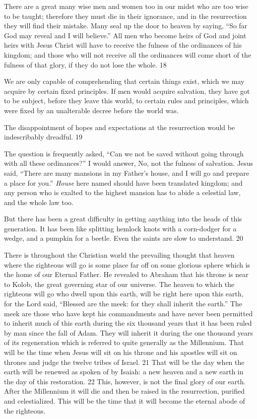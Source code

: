 There are a great many wise men and women too in our midst who are too wise to be taught;
therefore they must die in their ignorance, and in the resurrection they will find their mistake.
Many seal up the door to heaven by saying, ``So far God may reveal and I will believe.''
All men who become heirs of God and joint heirs with Jesus Christ will have to receive the
fulness of the ordinances of his kingdom; and those who will not receive all the ordinances
will come short of the fulness of that glory, if they do not lose the whole. 18

We are only capable of comprehending that certain things exist, which we may acquire by
certain fixed principles. If men would acquire salvation, they have got to be subject, before
they leave this world, to certain rules and principles, which were fixed by an unalterable
decree before the world was.

The disappointment of hopes and expectations at the resurrection would be indescribably
dreadful. 19

The question is frequently asked, ``Can we not be saved without going through with all these
ordinances?'' I would answer, No, not the fulness of salvation. Jesus said, ``There are many
mansions in my Father's house, and I will go and prepare a place for you.'' \textit{House} here named
should have been translated kingdom; and any person who is exalted to the highest mansion
has to abide a celestial law, and the whole law too.

But there has been a great difficulty in getting anything into the heads of this generation. It
has been like splitting hemlock knots with a corn-dodger for a wedge, and a pumpkin for a
beetle. Even the saints are slow to understand. 20

There is throughout the Christian world the prevailing thought that heaven where the
righteous will go is some place far off on some glorious sphere which is the home of our
Eternal Father. He revealed to Abraham that his throne is near to Kolob, the great governing
star of our universe. The heaven to which the righteous will go who dwell upon this earth,
will be right here upon this earth, for the Lord said, ``Blessed are the meek: for they shall
inherit the earth.'' The meek are those who have kept his commandments and have never
been permitted to inherit much of this earth during the six thousand years that it has been
ruled by man since the fall of Adam. They will inherit it during the one thousand years of its
regeneration which is referred to quite generally as the Millennium. That will be the time
when Jesus will sit on his throne and his apostles will sit on thrones and judge the twelve
tribes of Israel. 21 That will be the day when the earth will be renewed as spoken of by
Isaiah: a new heaven and a new earth in the day of this restoration. 22 This, however, is not
the final glory of our earth. After the Millennium it will die and then be raised in the
resurrection, purified and celestialized. This will be the time that it will become the eternal
abode of the righteous.

